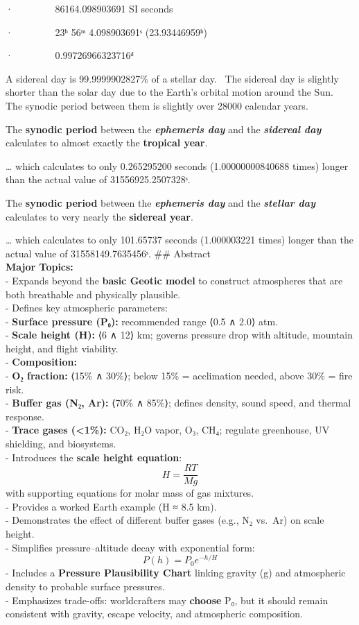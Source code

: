 \documentclass[
  letterpaper,
]{book}
\begin{document}
·~~~~~~~~ 86164.098903691 SI seconds

·~~~~~~~~ 23ʰ 56ᵐ 4.098903691ˢ (23.93446959ʰ)

·~~~~~~~~ 0.99726966323716ᵈ

A sidereal day is 99.9999902827\% of a stellar day.~ The sidereal day is
slightly shorter than the solar day due to the Earth's orbital motion
around the Sun.~ The synodic period between them is slightly over 28000
calendar years.

The \textbf{synodic period} between the \textbf{\emph{ephemeris day}}
and the \textbf{\emph{sidereal day}} calculates to almost exactly the
\textbf{tropical year}.

\ldots{} which calculates to only 0.265295200 seconds (1.00000000840688
times) longer than the actual value of 31556925.2507328ˢ.

The \textbf{synodic period} between the \textbf{\emph{ephemeris day}}
and the \textbf{\emph{stellar day}} calculates to very nearly the
\textbf{sidereal year}.

\ldots{} which calculates to only 101.65737 seconds (1.000003221 times)
longer than the actual value of 31558149.7635456ˢ. \#\# Abstract\\
\textbf{Major Topics:}\\
- Expands beyond the \textbf{basic Geotic model} to construct
atmospheres that are both breathable and physically plausible.\\
- Defines key atmospheric parameters:\\
- \textbf{Surface pressure (P₀):} recommended range ⟨0.5 ∧ 2.0⟩ atm.\\
- \textbf{Scale height (H):} ⟨6 ∧ 12⟩ km; governs pressure drop with
altitude, mountain height, and flight viability.\\
- \textbf{Composition:}\\
- \textbf{O₂ fraction:} ⟨15\% ∧ 30\%⟩; below 15\% = acclimation needed,
above 30\% = fire risk.\\
- \textbf{Buffer gas (N₂, Ar):} ⟨70\% ∧ 85\%⟩; defines density, sound
speed, and thermal response.\\
- \textbf{Trace gases (\textless1\%):} CO₂, H₂O vapor, O₃, CH₄; regulate
greenhouse, UV shielding, and biosystems.\\
- Introduces the \textbf{scale height equation}:\\
\[
  H = \dfrac{RT}{Mg}
  \] with supporting equations for molar mass of gas mixtures.\\
- Provides a worked Earth example (H ≈ 8.5 km).\\
- Demonstrates the effect of different buffer gases (e.g., N₂ vs.~Ar) on
scale height.\\
- Simplifies pressure--altitude decay with exponential form:\\
\[
  P(h) = P_0 e^{-h/H}
  \] - Includes a \textbf{Pressure Plausibility Chart} linking gravity
(g) and atmospheric density to probable surface pressures.\\
- Emphasizes trade-offs: worldcrafters may \textbf{choose} P₀, but it
should remain consistent with gravity, escape velocity, and atmospheric
composition.
\end{document}
